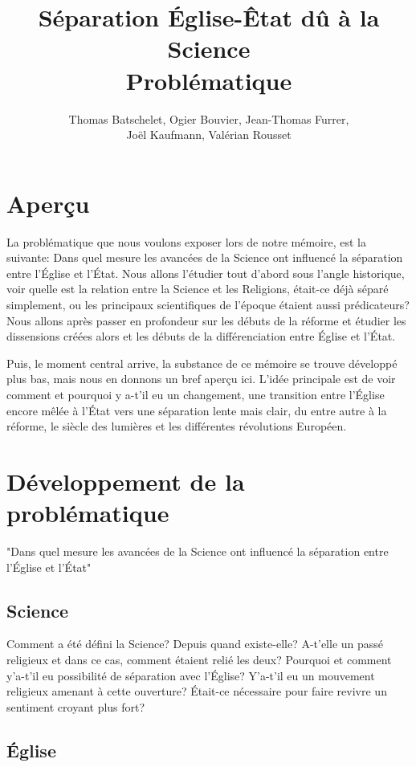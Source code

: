 \documentclass{article}
\title{Séparation Église-Êtat dû à la Science \\
	\large{Problématique}}
\author{Thomas Batschelet, Ogier Bouvier, Jean-Thomas Furrer, \\ Joël Kaufmann, Valérian Rousset}
\begin{document}
\maketitle

\section{Aperçu}

La problématique que nous voulons exposer lors de notre mémoire, est la
suivante: Dans quel mesure les avancées de la Science ont influencé la séparation
entre l'Église et l'État. Nous allons l'étudier tout d'abord sous l'angle
historique, voir quelle est la relation entre la Science et les Religions,
était-ce déjà séparé simplement, ou les principaux scientifiques de l'époque
étaient aussi prédicateurs? Nous allons après passer en profondeur sur les
débuts de la réforme et étudier les dissensions créées alors et les débuts de
la différenciation entre Église et l'État.

Puis, le moment central arrive, la substance de ce mémoire se trouve développé
plus bas, mais nous en donnons un bref aperçu ici. L'idée principale est de voir
comment et pourquoi y a-t'il eu un changement, une transition entre l'Église
encore mêlée à l'État vers une séparation lente mais clair, du entre autre à la
réforme, le siècle des lumières et les différentes révolutions Européen.

\section{Développement de la problématique}

"Dans quel mesure les avancées de la Science ont influencé la séparation
entre l'Église et l'État"

\subsection{Science}

Comment a été défini la Science? Depuis quand existe-elle? A-t'elle un passé
religieux et dans ce cas, comment étaient relié les deux? Pourquoi et comment
y'a-t'il eu possibilité de séparation avec l'Église? Y'a-t'il eu un mouvement
religieux amenant à cette ouverture? Était-ce nécessaire pour faire revivre un
sentiment croyant plus fort?

\subsection{Église}
\end{document}
